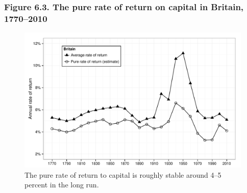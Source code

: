 \documentclass[t]{beamer}\usepackage[]{graphicx}\usepackage[]{color}
\newenvironment{knitrout}{}{} %
\begin{document}
\begin{frame}[label=Figure_6_3]
\frametitle{Figure 6.3. The pure rate of return on capital in Britain, 1770--2010}
\begin{figure}[t]
\begin{minipage}[b]{\textwidth}
\centering
\begin{knitrout}\footnotesize
{}\color{fgcolor}

{\centering \includegraphics[width=1\linewidth]{figures/bw/Figure_6_3} 

}



\end{knitrout}
\caption{The pure rate of return to capital is roughly stable around 4--5 percent in the long run.}
\end{minipage}
\end{figure}
\end{frame}
\end{document}
